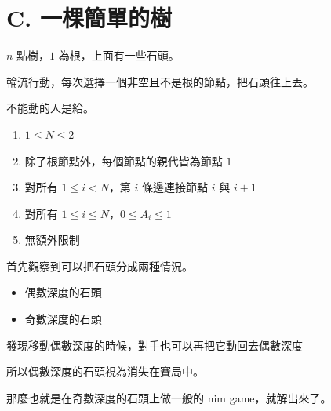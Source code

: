 \section{C. 一棵簡單的樹}

\begin{frame}{}
    $n$ 點樹，$1$ 為根，上面有一些石頭。

    輪流行動，每次選擇一個非空且不是根的節點，把石頭往上丟。

    不能動的人是給。
\end{frame}

\begin{frame}{}
    \begin{enumerate}
        \item{$1 \le N \le 2$}
        \item{除了根節點外，每個節點的親代皆為節點 $1$}
        \item{對所有 $1 \le i < N$，第 $i$ 條邊連接節點 $i$ 與 $i+1$}
        \item{對所有 $1 \le i \le N$，$0 \le A_i \le 1$}
        \item{無額外限制}
    \end{enumerate}
\end{frame}

\begin{frame}{}
    首先觀察到可以把石頭分成兩種情況。

    \begin{itemize}
        \item {偶數深度的石頭}
        \item {奇數深度的石頭}
    \end{itemize}

    發現移動偶數深度的時候，對手也可以再把它動回去偶數深度

    所以偶數深度的石頭視為消失在賽局中。

    那麼也就是在奇數深度的石頭上做一般的 nim game，就解出來了。
\end{frame}
